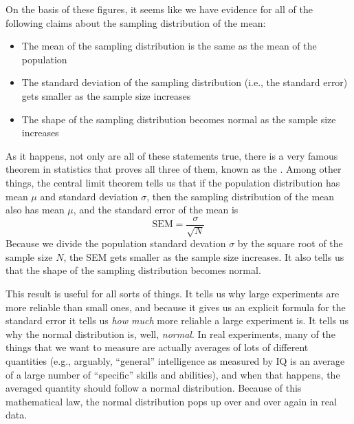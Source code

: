 On the basis of these figures, it seems like we have evidence for all of the following claims about the sampling distribution of the mean:
\begin{itemize} \itemsep -2pt
\item The mean of the sampling distribution is the same as the mean of the population
\item The standard deviation of the sampling distribution (i.e., the standard error) gets smaller as the sample size increases
\item The shape of the sampling distribution becomes normal as the sample size increases
\end{itemize}
As it happens, not only are all of these statements true, there is a very famous theorem in statistics that proves all three of them, known as the . Among other things, the central limit theorem tells us that if the population distribution has mean $\mu$ and standard deviation $\sigma$, then the sampling distribution of the mean also has mean $\mu$, and the standard error of the mean is 
$$
\mbox{SEM} = \frac{\sigma}{ \sqrt{N} }
$$ 
Because we divide the population standard devation $\sigma$ by the square root of the sample size $N$, the SEM gets smaller as the sample size increases. It also tells us that the shape of the sampling distribution becomes normal. 

This result is useful for all sorts of things. It tells us why large experiments are more reliable than small ones, and because it gives us an explicit formula for the standard error it tells us {\it how much} more reliable a large experiment is. It tells us why the normal distribution is, well, {\it normal}. In real experiments, many of the things that we want to measure are actually averages of lots of different quantities (e.g., arguably, ``general'' intelligence as measured by IQ is an average of a large number of ``specific'' skills and abilities), and when that happens, the averaged quantity should follow a normal distribution. Because of this mathematical law, the normal distribution pops up over and over again in real data. 




